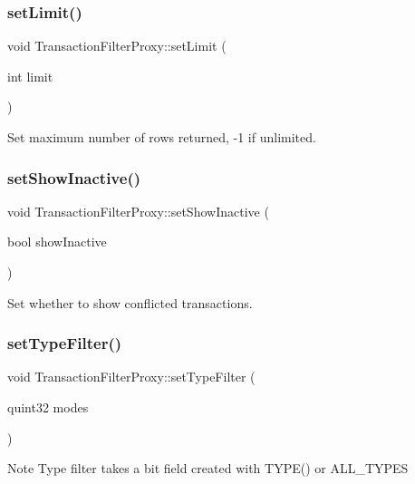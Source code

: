 \subsubsection{\texorpdfstring{set\+Limit()}{setLimit()}}
{\footnotesize\ttfamily void Transaction\+Filter\+Proxy\+::set\+Limit (\begin{DoxyParamCaption}\item[{int}]{limit }\end{DoxyParamCaption})}

Set maximum number of rows returned, -\/1 if unlimited. \mbox{\label{class_transaction_filter_proxy_aad1598cc4308eb08d8f617f08f62ece6}} 
\subsubsection{\texorpdfstring{set\+Show\+Inactive()}{setShowInactive()}}
{\footnotesize\ttfamily void Transaction\+Filter\+Proxy\+::set\+Show\+Inactive (\begin{DoxyParamCaption}\item[{bool}]{show\+Inactive }\end{DoxyParamCaption})}

Set whether to show conflicted transactions. \mbox{\label{class_transaction_filter_proxy_af28eee58aee7585b71f057d044408106}} 
\subsubsection{\texorpdfstring{set\+Type\+Filter()}{setTypeFilter()}}
{\footnotesize\ttfamily void Transaction\+Filter\+Proxy\+::set\+Type\+Filter (\begin{DoxyParamCaption}\item[{quint32}]{modes }\end{DoxyParamCaption})}

\begin{DoxyNote}{Note}
Type filter takes a bit field created with T\+Y\+P\+E() or A\+L\+L\+\_\+\+T\+Y\+P\+ES 
\end{DoxyNote}


